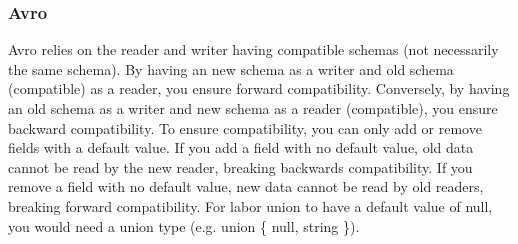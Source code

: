 \documentclass[12pt, titlepage]{report}
\begin{document}
\subsubsection{Avro}
Avro relies on the reader and writer having compatible schemas (not necessarily the same schema). By having an new schema as a writer and old schema (compatible) as a reader, you ensure forward compatibility. Conversely, by having an old schema as a writer and new schema as a reader (compatible), you ensure backward compatibility. To ensure compatibility, you can only add or remove fields with a default value. If you add a field with no default value, old data cannot be read by the new reader, breaking backwards compatibility. If you remove a field with no default value, new data cannot be read by old readers, breaking forward compatibility. For labor union to have a default value of null, you would need a union type (e.g. union \{ null, string \}). 
\end{document}
